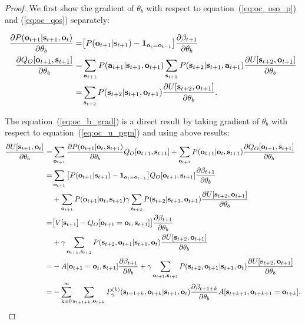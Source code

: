 \begin{proof}
  We first show the gradient of $\theta_b$ with respect to
  equation~(\ref{eq:oc_oso_p}) and (\ref{eq:oc_qos}) separately:

  \begin{align}
    \label{eq:oc_oso_p_grad} \frac{\partial P({\mathbf{o}}_{t+1}|{\mathbf{s}}_{t+1},{\mathbf{o}}_{t})}{\partial \theta_b} = &\big[P({\mathbf{o}}_{t+1}|{\mathbf{s}}_{t+1})-\bm{1}_\mathrm{{\mathbf{o}}_t={\mathbf{o}}_{t-1}}\big]\frac{\partial \beta_{t+1}}{\partial \theta_b}\\
    \nonumber\frac{\partial Q_O[{\mathbf{o}}_{t+1},{\mathbf{s}}_{t+1}]}{\partial \theta_b} =& \sum_{{\mathbf{a}}_{t+1}}P({\mathbf{a}}_{t+1}|{\mathbf{s}}_{t+1},{\mathbf{o}}_{t+1})\sum_{{\mathbf{s}}_{t+2}}P({\mathbf{s}}_{t+2}|{\mathbf{s}}_{t+1},{\mathbf{a}}_{t+1})\frac{\partial U[{\mathbf{s}}_{t+2},{\mathbf{o}}_{t+1}]}{\partial \theta_b}\\
 \label{eq:oc_qos_grad}   =&\sum_{{\mathbf{s}}_{t+2}}P({\mathbf{s}}_{t+2}|{\mathbf{s}}_{t+1},{\mathbf{o}}_{t+1})\frac{\partial U[{\mathbf{s}}_{t+2},{\mathbf{o}}_{t+1}]}{\partial \theta_b}.
  \end{align}

  The equation~(\ref{eq:oc_b_grad}) is a direct result by taking
  gradient of $\theta_b$ with respect to
  equation~(\ref{eq:oc_u_pgm}) and using above results:
  \begin{align*}
    \frac{\partial U[ {\mathbf{s}}_{t+1},{\mathbf{o}}_t ]}{\partial \theta_b}=&\sum_{{\mathbf{o}}_{t+1}}\frac{\partial P({\mathbf{o}}_{t+1}|{\mathbf{o}}_t,{\mathbf{s}}_{t+1})}{\partial \theta_b}Q_O[{\mathbf{o}}_{t+1},{\mathbf{s}}_{t+1}] + \sum_{{\mathbf{o}}_{t+1}}P({\mathbf{o}}_{t+1}|{\mathbf{o}}_t,{\mathbf{s}}_{t+1})\frac{\partial Q_O[{\mathbf{o}}_{t+1},{\mathbf{s}}_{t+1}]}{\partial \theta_b}\\
    =&\sum_{{\mathbf{o}}_{t+1}} \big[P({\mathbf{o}}_{t+1}|{\mathbf{s}}_{t+1})-\bm{1}_\mathrm{{\mathbf{o}}_t={\mathbf{o}}_{t-1}}\big]Q_O[{\mathbf{o}}_{t+1},{\mathbf{s}}_{t+1}]\frac{\partial \beta_{t+1}}{\partial \theta_b}\\
    &+\sum_{{\mathbf{o}}_{t+1}}P({\mathbf{o}}_{t+1}|{\mathbf{o}}_t,{\mathbf{s}}_{t+1})\gamma\sum_{{\mathbf{s}}_{t+2}}P({\mathbf{s}}_{t+2}|{\mathbf{s}}_{t+1},{\mathbf{o}}_{t+1})\frac{\partial U[{\mathbf{s}}_{t+2},{\mathbf{o}}_{t+1}]}{\partial \theta_b}\\
    =& \big[V[ {\mathbf{s}}_{t+1} ]-Q_O[{\mathbf{o}}_{t+1}={\mathbf{o}}_t,{\mathbf{s}}_{t+1}]\big]\frac{\partial \beta_{t+1}}{\partial \theta_b}\\
    &+\gamma\sum_{{\mathbf{o}}_{t+1},{\mathbf{s}}_{t+2}}P({\mathbf{s}}_{t+2},{\mathbf{o}}_{t+1}|{\mathbf{s}}_{t+1},{\mathbf{o}}_{t})\frac{\partial U[{\mathbf{s}}_{t+2},{\mathbf{o}}_{t+1}]}{\partial \theta_b}\\
    =& -A[{\mathbf{o}}_{t+1}={\mathbf{o}}_t,{\mathbf{s}}_{t+1}]\frac{\partial \beta_{t+1}}{\partial \theta_b}+\gamma\sum_{{\mathbf{o}}_{t+1},{\mathbf{s}}_{t+2}}P({\mathbf{s}}_{t+2},{\mathbf{o}}_{t+1}|{\mathbf{s}}_{t+1},{\mathbf{o}}_{t})\frac{\partial U[{\mathbf{s}}_{t+2},{\mathbf{o}}_{t+1}]}{\partial \theta_b}\\
    =&-\sum_{{\textnormal{k}}=0}^\infty\sum_{{\mathbf{s}}_{t+1+k},{\mathbf{o}}_{t+k}}P_\gamma^{(k)}({\mathbf{s}}_{t+1+k},{\mathbf{o}}_{t+k}|{\mathbf{s}}_{t+1},{\mathbf{o}}_t)
                         \frac{\partial \beta_{t+1+k}}{\partial \theta_b}A[ {\mathbf{s}}_{t+k+1},{\mathbf{o}}_{t+k+1}={\mathbf{o}}_{t+k}].
  \end{align*}
  
\end{proof}
\newpage
